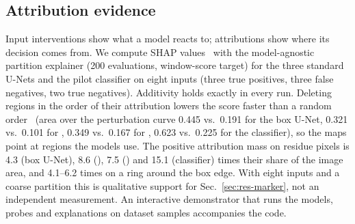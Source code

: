 \subsection{Attribution evidence}
\label{sec:res-xai}
Input interventions show what a model reacts to; attributions show where its decision comes from. We compute SHAP values~\cite{lundberg2017shap} with the model-agnostic partition explainer (200 evaluations, window-score target) for the three standard U-Nets and the pilot classifier on eight inputs (three true positives, three false negatives, two true negatives). Additivity holds exactly in every run. Deleting regions in the order of their attribution lowers the score faster than a random order~\cite{samek2017evaluating} (area over the perturbation curve 0.445 vs.\ 0.191 for the box U-Net, 0.321 vs.\ 0.101 for \GTp, 0.349 vs.\ 0.167 for \GTg, 0.623 vs.\ 0.225 for the classifier), so the maps point at regions the models use. The positive attribution mass on residue pixels is 4.3 (box U-Net), 8.6 (\GTp), 7.5 (\GTg) and 15.1 (classifier) times their share of the image area, and 4.1--6.2 times on a ring around the box edge. With eight inputs and a coarse partition this is qualitative support for Sec.~\ref{sec:res-marker}, not an independent measurement. An interactive demonstrator that runs the models, probes and explanations on dataset samples accompanies the code.
